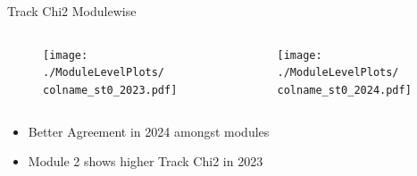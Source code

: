 \begin{frame}{Track Chi2 Modulewise}
    \newcommand{\colname}{Track_Chi2}
    \begin{columns}
        \begin{column}{0.6\linewidth}
            \begin{figure}
                \centering
                \texttt{[image: ./ModuleLevelPlots/\\colname\_st0\_2023.pdf]}
            \end{figure}
        \end{column}
        \begin{column}{0.6\linewidth}
            \begin{figure}
                \centering
                \texttt{[image: ./ModuleLevelPlots/\\colname\_st0\_2024.pdf]}
            \end{figure}
        \end{column}
    \end{columns}

    \begin{itemize}
        \small
        \item Better Agreement in 2024 amongst modules
        \item Module 2 shows higher Track Chi2 in 2023
    \end{itemize}
\end{frame}

